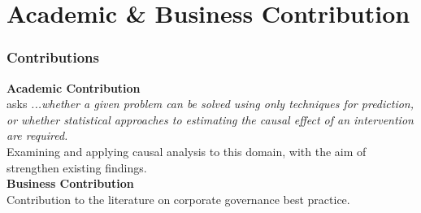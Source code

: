 \documentclass{beamer}
\begin{document}

\section {Academic \& Business Contribution}
\begin{frame}[t]
\frametitle{Contributions}
{\bf Academic Contribution} \\
\small \cite{Athey483} asks {\it...whether a given problem can be solved using only techniques for prediction, or whether statistical approaches to estimating the causal effect of an intervention are required. }\\
\vspace{0.2cm}
{Examining and applying causal analysis to this domain, with the aim of strengthen existing findings. }\\
\vspace{1cm}
{\bf Business Contribution} \\
Contribution to the literature on corporate governance best practice.
\end{frame}
\end{document}
